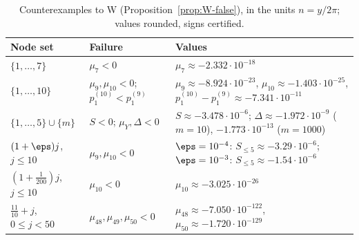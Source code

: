 \begin{table}[ht]
\centering\small
\caption{Counterexamples to W (Proposition~\ref{prop:W-false}), in the units $n=y/2\pi$; values rounded, signs certified.}
\label{tab:app-W}
\begin{tabular}{@{}>{\raggedright\arraybackslash}p{}>{\raggedright\arraybackslash}p{}>{\raggedright\arraybackslash}p{}@{}}
\toprule
Node set & Failure & Values \\
\midrule
$\{1,\dots,7\}$ & $\mu_7<0$ & $\mu_7\approx-2.332\cdot10^{-18}$ \\
$\{1,\dots,10\}$ & $\mu_9,\mu_{10}<0$; $p_1^{(10)}<p_1^{(9)}$ & $\mu_9\approx-8.924\cdot10^{-23}$, $\mu_{10}\approx-1.403\cdot10^{-25}$,
$p_1^{(10)}-p_1^{(9)}\approx-7.341\cdot10^{-11}$ \\
$\{1,\dots,5\}\cup\{m\}$ & $S<0$; $\mu_Y,\Delta<0$ & $S\approx-3.478\cdot10^{-6}$; $\Delta\approx-1.972\cdot10^{-9}$ ($m=10$),
$-1.773\cdot10^{-13}$ ($m=1000$) \\
$(1+\eps)j$, $j\le10$ & $\mu_9,\mu_{10}<0$ & $\eps=10^{-4}$: $S_{\le5}\approx-3.29\cdot10^{-6}$; $\eps=10^{-3}$: $S_{\le5}\approx-1.54\cdot10^{-6}$ \\
$(1+\frac1{200})j$, $j\le10$ & $\mu_{10}<0$ & $\mu_{10}\approx-3.025\cdot10^{-26}$ \\
$\frac{11}{10}+j$, $0\le j<50$ & $\mu_{48},\mu_{49},\mu_{50}<0$ & $\mu_{48}\approx-7.050\cdot10^{-122}$, $\mu_{50}\approx-1.720\cdot10^{-129}$ \\
\bottomrule
\end{tabular}
\end{table}
